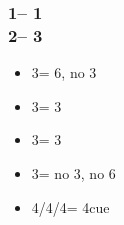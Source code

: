 \documentclass[12pt, a4paper]{article}
\begin{document}
\subsubsection*{1\diams -- 1\hearts \\ 2\nt -- 3\clubs}
\begin{itemize}
    \item 3\diams = 6\diams, no 3
    \item 3\hearts = 3\hearts
    \item 3\spades = 3\diams
    \item 3\nt = no 3\hearts, no 6\diams
    \item 4\clubs/4\diams/4\hearts = 4\hearts cue
\end{itemize}

\end{document}
